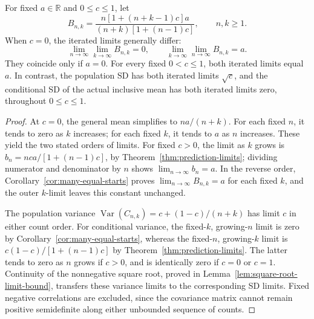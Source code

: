 \begin{theorem}
\label{thm:two-count-limits}
For fixed \(a\in\mathbb R\) and \(0\leq c\leq1\), let
\[
 B_{n,k}=\frac{n[1+(n+k-1)c]a}
                  {(n+k)[1+(n-1)c]},\qquad n,k\geq1.
\]
When \(c=0\), the iterated limits generally differ:
\[
 \lim_{n\to\infty}\lim_{k\to\infty}B_{n,k}=0,\qquad
 \lim_{k\to\infty}\lim_{n\to\infty}B_{n,k}=a.
\]
They coincide only if \(a=0\). For every fixed \(0<c\leq1\),
both iterated limits equal \(a\). In contrast, the population SD has
both iterated limits \(\sqrt c\), and the conditional SD of the
actual inclusive mean has both iterated limits zero, throughout
\(0\leq c\leq1\).
\end{theorem}
\begin{proof}
At \(c=0\), the general mean simplifies to \(na/(n+k)\).
For each fixed \(n\), it tends to zero as \(k\) increases; for each
fixed \(k\), it tends to \(a\) as \(n\) increases. These yield the
two stated orders of limits. For fixed \(c>0\), the limit as \(k\)
grows is \(b_n=nca/[1+(n-1)c]\), by
Theorem~\ref{thm:prediction-limits}; dividing numerator and denominator
by \(n\) shows \(\lim_{n\to\infty}b_n=a\). In the reverse order,
Corollary~\ref{cor:many-equal-starts} proves
\(\lim_{n\to\infty}B_{n,k}=a\) for each fixed \(k\), and the
outer \(k\)-limit leaves this constant unchanged.

The population variance
\(\operatorname{Var}(C_{n,k})=c+(1-c)/(n+k)\)
has limit \(c\) in either count order. For conditional variance, the
fixed-\(k\), growing-\(n\) limit is zero by
Corollary~\ref{cor:many-equal-starts}, whereas the fixed-\(n\),
growing-\(k\) limit is \(c(1-c)/[1+(n-1)c]\)
by Theorem~\ref{thm:prediction-limits}. The latter tends to
zero as \(n\) grows if \(c>0\), and is identically zero if
\(c=0\) or \(c=1\). Continuity of the nonnegative square root,
proved in Lemma~\ref{lem:square-root-limit-bound}, transfers these
variance limits to the corresponding SD limits. Fixed negative
correlations are excluded, since the covariance matrix cannot remain
positive semidefinite along either unbounded sequence of counts.
\end{proof}
